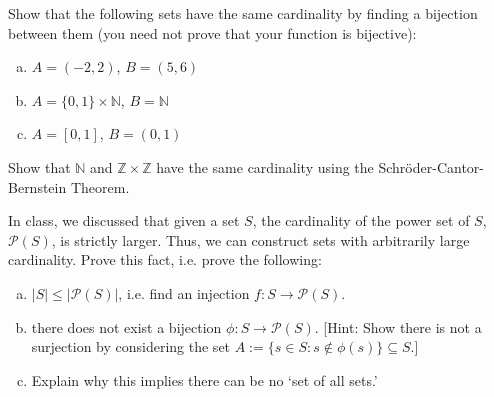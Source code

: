 \documentclass[11pt,letterpaper]{article}
\begin{document}
\homework{}

 Show that the following sets have the same cardinality by finding a bijection between them (you need not prove that your function is bijective): 
\begin{enumerate}[(a)]
\item $A= (-2, 2)$, $B= (5, 6)$
\item $A= \{ 0, 1 \} \times \mathbb{N}$, $B= \mathbb{N}$
\item $A= [0, 1]$, $B= (0, 1)$
\end{enumerate}





\newpage





 Show that $\mathbb{N}$ and $\mathbb{Z} \times \mathbb{Z}$ have the same cardinality using the Schr\"oder-Cantor-Bernstein Theorem. 





\newpage





 In class, we discussed that given a set $S$, the cardinality of the power set of $S$, $\mathcal{P}(S)$, is strictly larger. Thus, we can construct sets with arbitrarily large cardinality. Prove this fact, i.e. prove the following:
\begin{enumerate}[(a)]
\item $|S| \leq |\mathcal{P}(S)|$, i.e. find an injection $f: S \to \mathcal{P}(S)$.
\item there does not exist a bijection $\phi: S \to \mathcal{P}(S)$. [Hint: Show there is not a surjection by considering the set $A:= \{ s \in S \colon s \notin \phi(s) \} \subseteq S$.]
\item Explain why this implies there can be no `set of all sets.' 
\end{enumerate}





\newpage
\end{document}
